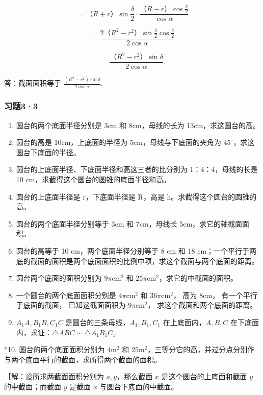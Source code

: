 \[
= \text{（}R + r\text{）} \sin \frac {\delta}{2} \cdot \frac {\text{（}R - r\text{）} \cos \frac {\delta}{2}}{\cos \alpha}
\]

\[
= \frac {2 \text{（}R ^ {2} - r ^ {2}\text{）} \sin \frac {\delta}{2} \cos \frac {\delta}{2}}{2 \cos \alpha}
\]

\[
= \frac {\text{（}R ^ {2} - r ^ {2}\text{）} \sin \delta}{2 \cos \alpha}.
\]

答：截面面积等于 \(\frac{(R^2 - r^2)\sin\delta}{2\cos\alpha}\).

\subsubsection{习题3·3}

\begin{enumerate}
\item
  圆台的两个底面半径分别是 3cm 和 8cm，母线的长为 13cm，求这圆台的高。
\item
  圆台的高是 10cm，上底面的半径为 5cm，母线与下底面的夹角为
  \(45^{\circ}\)，求这圆台下底面的半径。
\item
  圆台的上底面半径、下底面半径和高这三者的比分别为 1：4：4，母线的长是
  10 cm，求截得这个圆台的圆锥的底面半径和高。
\item
  圆台的上底面半径是 r，下底面半径是 R，高是
  h。求截得这个圆台的圆锥的高。
\item
  圆台的两个底面半径分别等于 3cm 和 7cm，母线长 5cm，求它的轴截面面积。
\item
  圆台的高等于 10 cm，两个底面半径分别等于 8 cm 和 18
  cm；一个平行于两底的截面的面积是两个底面面积的比例中项，求这个截面与两个底面的距离。
\item
  圆台两个底面的面积分别为 \(9\pi \mathrm{cm}^2\) 和
  \(25\pi \mathrm{cm}^2\)，求它的中截面的面积。
\item
  一个圆台的两个底面面积分别是 \(4\pi \mathrm{cm}^2\) 和
  \(36\pi \mathrm{cm}^2\)， 高为 \(8\mathrm{cm}\)，
  有一个平行于底面的截面， 已知这截面面积为 \(9\pi \mathrm{cm}^2\)，
  求这个截面和两个底面的距离。
\item
  \(A_{1}A, B_{1}B, C_{1}C\) 是圆台的三条母线，\(A_{1}, B_{1}, C_{1}\)
  在上底面内，\(A, B, C\)
  在下底面内，求证：\(\triangle ABC \sim \triangle A_{1}B_{1}C_{1}\).
\end{enumerate}

*10. 圆台的两个底面面积分别为 \(4\mathrm{m}^2\) 和
\(25\mathrm{m}^2\)，三等分它的高，并过分点分别作与两个底面平行的截面，求所得两个截面的面积。

［解：设所求两截面面积分别为 \(a, y\)，那么截面 \(x\)
是这个圆台的上底面和截面 \(y\) 的中截面；而截面 \(y\) 是截面 \(x\)
与圆台下底面的中截面。

